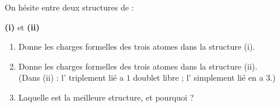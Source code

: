 \documentclass[11pt,a4paper]{article}
\begin{document}
\begin{exo}
On hésite entre deux structures de  :
\begin{center}
\textbf{(i)}  \qquad et \qquad \textbf{(ii)} 
\end{center}
\begin{enumerate}[label=\alph*)]
  \item Donne les charges formelles des trois atomes dans la structure (i).
  \item Donne les charges formelles des trois atomes dans la structure (ii). \\
        (Dans (ii) : l' triplement lié a $1$ doublet libre ; l' simplement lié en a $3$.)
  \item Laquelle est la meilleure structure, et pourquoi ?
\end{enumerate}
\end{exo}
\end{document}

